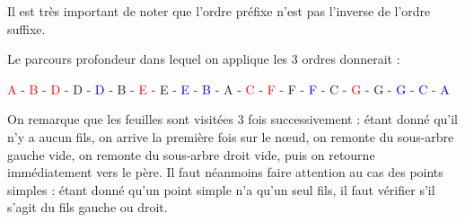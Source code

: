 \documentclass[11pt,a4paper]{article}
\begin{document}
\medskip

Il est très important de noter que l'ordre préfixe n'est pas l'inverse de l'ordre suffixe.

\medskip

Le parcours profondeur dans lequel on applique les 3 ordres donnerait :

\begin{center}
\textcolor{red}{A} -
\textcolor{red}{B} -
\textcolor{red}{D} -
\textcolor{green(htmlcssgreen)}{D} -
\textcolor{blue}{D} -
\textcolor{green(htmlcssgreen)}{B} -
\textcolor{red}{E} -
\textcolor{green(htmlcssgreen)}{E} -
\textcolor{blue}{E} -
\textcolor{blue}{B} -
\textcolor{green(htmlcssgreen)}{A} - %
\textcolor{red}{C} -
\textcolor{red}{F} -
\textcolor{green(htmlcssgreen)}{F} -
\textcolor{blue}{F} -
\textcolor{green(htmlcssgreen)}{C} -
\textcolor{red}{G} -
\textcolor{green(htmlcssgreen)}{G} -
\textcolor{blue}{G} -
\textcolor{blue}{C} -
\textcolor{blue}{A}
\end{center}

\medskip

On remarque que les feuilles sont visitées 3 fois successivement : étant donné qu'il n'y a aucun fils, on arrive la première fois sur le nœud, on remonte du sous-arbre gauche vide, on remonte du sous-arbre droit vide, puis on retourne immédiatement vers le père.
Il faut néanmoins faire attention au cas des points simples : étant donné qu'un point simple n'a qu'un seul fils, il faut vérifier s'il s'agit du fils gauche ou droit.

\clearpage

%

\begin{center}
\end{center}

\bigskip

\end{document}
